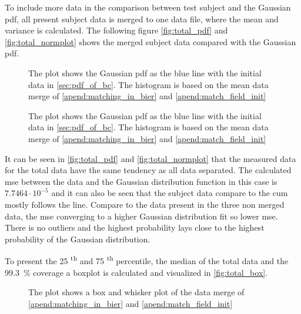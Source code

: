 {{To include more data in the comparison between test subject and the Gaussian \gls{pdf}, all present subject data is merged to one data file, where the mean and variance is calculated. The following figure \autoref{fig:total_pdf} and \autoref{fig:total_normplot} shows the merged subject data compared with the Gaussian \gls{pdf}.


 \begin{figure}[H]
	\centering
	
		\caption{The plot shows the Gaussian  \gls{pdf} as the blue line with the initial data in \autoref{sec:pdf_of_bc}. The histogram is based on the mean data merge of \autoref{apend:matching_in_bier} and \autoref{apend:match_field_init}}
		\label{fig:total_pdf}
\end{figure}

 \begin{figure}[H]
	\centering
	
		\caption{The plot shows the Gaussian  \gls{pdf} as the blue line with the initial data in \autoref{sec:pdf_of_bc}. The histogram is based on the mean data merge of \autoref{apend:matching_in_bier} and \autoref{apend:match_field_init}}
		\label{fig:total_normplot}
\end{figure}

It can be seen in \autoref{fig:total_pdf} and \autoref{fig:total_normplot} that the measured data for the total data have the same tendency as all data separated. The calculated \gls{mse} between the data and the Gaussian distribution function in this case is $7.7464 \cdot 10^{-5}$ and it can also be seen that the subject data compare to the \gls{cum} mostly follows the line. Compare to the data present in the three non merged data, the \gls{mse} converging to a higher Gaussian distribution fit so lower \gls{mse}. There is no outliers and the highest probability lays close to the highest probability of the Gaussian distribution. 

To present the 25 \textsuperscript{th} and 75 \textsuperscript{th} percentile, the median of the total data and the \SI{99.3}{\percent} coverage a boxplot is calculated and visualized in \autoref{fig:total_box}.

 \begin{figure}[H]
	\centering
	
		\caption{The plot shows a box and whisker plot of the data merge of \autoref{apend:matching_in_bier} and \autoref{apend:match_field_init}}
		\label{fig:total_box}
\end{figure}


}}
